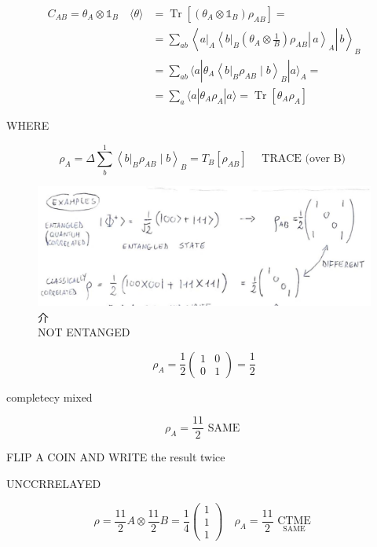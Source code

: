 \documentclass[10pt]{article}
\begin{document}
$$
\begin{aligned}
C_{A B}=\theta_{A} \otimes \mathbb{1}_{B} \quad\langle\theta\rangle & =\operatorname{Tr}\left[\left(\theta_{A} \otimes \mathbb{1}_{B}\right) \rho_{A B}\right]= \\
& =\sum_{a b}\left\langle\left.\left. a\right|_{A}\left\langle\left.\left. b\right|_{B}\left(\theta_{A} \otimes \frac{1}{B}\right) \rho_{A B} \right\rvert\, a\right\rangle_{A} \right\rvert\, b\right\rangle_{B} \\
& =\sum_{a b}\langle a| \theta_{A}\left\langle\left. b\right|_{B} \rho_{A B} \mid b\right\rangle_{B}|a\rangle_{A}= \\
& =\sum_{a}\langle a| \theta_{A} \rho_{A}|a\rangle=\operatorname{Tr}\left[\theta_{A} \rho_{A}\right]
\end{aligned}
$$

WHERE

$$
\rho_{A}=\Delta \sum_{b}^{1}\left\langle\left. b\right|_{B} \rho_{A B} \mid b\right\rangle_{B}=T_{B}\left[\rho_{A B}\right] \quad \text { TRACE (over B) }
$$

\begin{figure}[h]
\begin{center}
  \includegraphics[width=\textwidth]{2025_10_16_1bd50d0393172dac5e59g-04}
\captionsetup{labelformat=empty}
\caption{介\\
NOT ENTANGED}
\end{center}
\end{figure}

$$
\rho_{A}=\frac{1}{2}\left(\begin{array}{ll}
1 & 0 \\
0 & 1
\end{array}\right)=\frac{1}{2}
$$

completecy mixed

$$
\rho_{A}=\frac{11}{2} \text { SAME }
$$

FLIP A COIN AND WRITE the result twice

UNCCRRELAYED

$$
\rho=\frac{11}{2} A \otimes \frac{11}{2} B=\frac{1}{4}\left(\begin{array}{l}
1 \\
1 \\
1
\end{array}\right) \quad \rho_{A}=\frac{11}{2} \underset{\text { SAME }}{\text { CTME }}
$$
\end{document}
